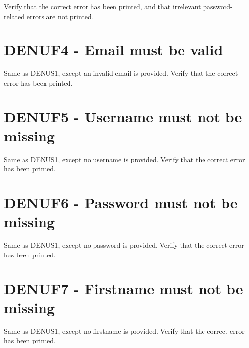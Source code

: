 \documentclass{article}
\begin{document}
Verify that the correct error has been printed, and that
irrelevant password-related errors are not printed.

\section*{DENUF4 - Email must be valid}

Same as DENUS1, except an invalid email is provided.
Verify that the correct error has been printed.

\section*{DENUF5 - Username must not be missing}

Same as DENUS1, except no username is provided.
Verify that the correct error has been printed.

\section*{DENUF6 - Password must not be missing}

Same as DENUS1, except no password is provided.
Verify that the correct error has been printed.

\section*{DENUF7 - Firstname must not be missing}

Same as DENUS1, except no firstname is provided.
Verify that the correct error has been printed.

\section*{DENUF8 - Surname must not be missing}

Same as DENUS1, except no surname is provided.
Verify that the correct error has been printed.

\section*{DENUF9 - Email must not be missing}

Same as DENUS1, except no email is provided.
Verify that the correct error has been printed.

\section*{DENUF10 - City must not be missing}
\end{document}
